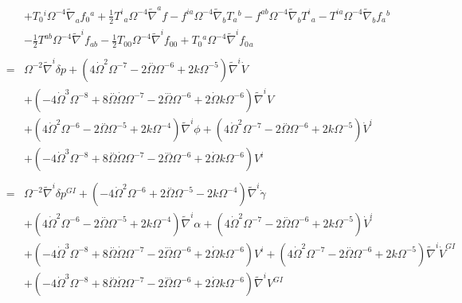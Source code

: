 \documentclass[10pt,letterpaper]{article}
\numberwithin{equation}{section}
\begin{document}
\begin{eqnarray}
&& + T_{0}{}^{i} \Omega^{-4} \tilde{\nabla}_{a}f_{0}{}^{a} + \tfrac{1}{2} T^{i}{}_{a} \Omega^{-4} \tilde{\nabla}^{a}f -  f^{ia} \Omega^{-4} \tilde{\nabla}_{b}T_{a}{}^{b} -  f^{ab} \Omega^{-4} \tilde{\nabla}_{b}T^{i}{}_{a} -  T^{ia} \Omega^{-4} \tilde{\nabla}_{b}f_{a}{}^{b} \nonumber \\ 
&& -  \tfrac{1}{2} T^{ab} \Omega^{-4} \tilde{\nabla}^{i}f_{ab} -  \tfrac{1}{2} T_{00}{} \Omega^{-4} \tilde{\nabla}^{i}f_{00}{} + T_{0}{}^{a} \Omega^{-4} \tilde{\nabla}^{i}f_{0}{}_{a}
\\  \nonumber\\ 
&=& \Omega^{-2} \tilde{\nabla}^{i}\delta p + (4 \dot{\Omega}^2 \Omega^{-7} - 2 \overset{..}{\Omega} \Omega^{-6} + 2 k \Omega^{-5}) \tilde{\nabla}^{i}\dot{V} \nonumber \\ 
&& + (-4 \dot{\Omega}^3 \Omega^{-8} + 8 \overset{..}{\Omega} \dot{\Omega} \Omega^{-7} - 2 \overset{...}{\Omega} \Omega^{-6} + 2 \dot{\Omega} k \Omega^{-6}) \tilde{\nabla}^{i}V \nonumber \\ 
&& + (4 \dot{\Omega}^2 \Omega^{-6} - 2 \overset{..}{\Omega} \Omega^{-5} + 2 k \Omega^{-4}) \tilde{\nabla}^{i}\phi +(4 \dot{\Omega}^2 \Omega^{-7} - 2 \overset{..}{\Omega} \Omega^{-6} + 2 k \Omega^{-5}) \dot{V}^{i} \nonumber \\ 
&& + (-4 \dot{\Omega}^3 \Omega^{-8} + 8 \overset{..}{\Omega} \dot{\Omega} \Omega^{-7} - 2 \overset{...}{\Omega} \Omega^{-6} + 2 \dot{\Omega} k \Omega^{-6}) V^{i}
\\  \nonumber\\ 
&=& \Omega^{-2} \tilde{\nabla}^{i}\delta p^{GI}{} + (-4 \dot{\Omega}^2 \Omega^{-6} + 2 \overset{..}{\Omega} \Omega^{-5} - 2 k \Omega^{-4}) \tilde{\nabla}^{i}\dot{\gamma} \nonumber \\ 
&& + (4 \dot{\Omega}^2 \Omega^{-6} - 2 \overset{..}{\Omega} \Omega^{-5} + 2 k \Omega^{-4}) \tilde{\nabla}^{i}\alpha +(4 \dot{\Omega}^2 \Omega^{-7} - 2 \overset{..}{\Omega} \Omega^{-6} + 2 k \Omega^{-5}) \dot{V}^{i} \nonumber \\ 
&& + (-4 \dot{\Omega}^3 \Omega^{-8} + 8 \overset{..}{\Omega} \dot{\Omega} \Omega^{-7} - 2 \overset{...}{\Omega} \Omega^{-6} + 2 \dot{\Omega} k \Omega^{-6}) V^{i} + (4 \dot{\Omega}^2 \Omega^{-7} - 2 \overset{..}{\Omega} \Omega^{-6} + 2 k \Omega^{-5}) \tilde{\nabla}^{i}\dot{V}^{GI}{} \nonumber \\ 
&& + (-4 \dot{\Omega}^3 \Omega^{-8} + 8 \overset{..}{\Omega} \dot{\Omega} \Omega^{-7} - 2 \overset{...}{\Omega} \Omega^{-6} + 2 \dot{\Omega} k \Omega^{-6}) \tilde{\nabla}^{i}V^{GI}{}
\\ \nonumber\\

\end{eqnarray}
\end{document}
